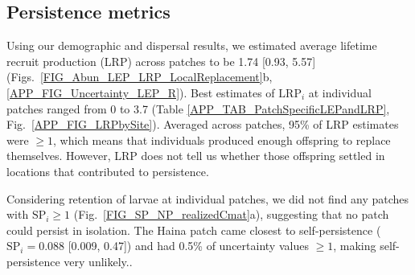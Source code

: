 \documentclass[12pt, oneside]{article}   	%
\begin{document}
\subsection*{Persistence metrics}

Using our demographic and dispersal results, we estimated average lifetime recruit production (LRP) across patches to be 1.74 [0.93, 5.57] (Figs.\ \ref{FIG_Abun_LEP_LRP_LocalReplacement}b, \ref{APP_FIG_Uncertainty_LEP_R}). Best estimates of $\text{LRP}_i$ at individual patches ranged from 0 to 3.7 (Table \ref{APP_TAB_PatchSpecificLEPandLRP}, Fig.\ \ref{APP_FIG_LRPbySite}). Averaged across patches, 95\% of LRP estimates were $\geq 1$, which means that individuals produced enough offspring to replace themselves. However, LRP does not tell us whether those offspring settled in locations that contributed to persistence.


Considering retention of larvae at individual patches, we did not find any patches with $\text{SP}_{i} \geq 1$ (Fig.\ \ref{FIG_SP_NP_realizedCmat}a), suggesting that no patch could persist in isolation. The Haina patch came closest to self-persistence ($\text{SP}_i = 0.088$ [0.009, 0.47]) and had 0.5\% of uncertainty values $ \geq 1$, making self-persistence very unlikely.. %

\end{document}
